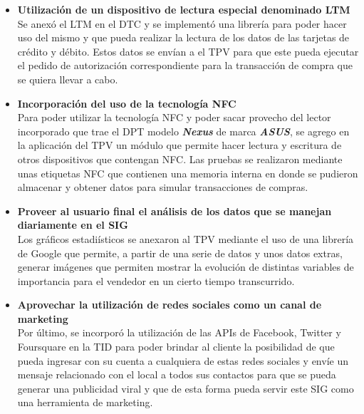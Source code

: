 \begin{itemize}
	\item \textbf{Utilizaci\'on de un dispositivo de lectura especial denominado \ac{LTM}}\\
	  Se anex\'o el \ac{LTM} en el \ac{DTC} y se implement\'o una librer\'ia para poder hacer uso del mismo y que pueda realizar la lectura de los datos de las tarjetas de cr\'edito y d\'ebito. Estos datos se env\'ian a el \ac{TPV} para que este pueda ejecutar el pedido de autorizaci\'on correspondiente para la transacci\'on de compra que se quiera llevar a cabo.

	\item \textbf{Incorporaci\'on del uso de la tecnolog\'ia \ac{NFC}}\\
		Para poder utilizar la tecnolog\'ia \ac{NFC} y poder sacar provecho del lector incorporado que trae el \ac{DPT} modelo \textbf{\textit{Nexus}} de marca \textbf{\textit{ASUS}}, se agrego en la aplicaci\'on del \ac{TPV} un m\'odulo que permite hacer lectura y escritura de otros dispositivos que contengan \ac{NFC}. Las pruebas se realizaron mediante unas etiquetas \ac{NFC} que contienen una memoria interna en donde se pudieron almacenar y obtener datos para simular transacciones de compras.
	
	\item \textbf{Proveer al usuario final el an\'alisis de los datos que se manejan diariamente en el \ac{SIG}}\\
		Los gr\'aficos estadi\'isticos se anexaron al \ac{TPV} mediante el uso de una librer\'ia de Google\Si{\texttrademark} que permite, a partir de una serie de datos y unos datos extras, generar im\'agenes que permiten mostrar la evoluci\'on de distintas variables de importancia para el vendedor en un cierto tiempo transcurrido.
	
	\item \textbf{Aprovechar la utilizaci\'on de redes sociales como un canal de marketing}\\
    Por \'ultimo, se incorpor\'o la utilizaci\'on de las \ac{APIs} de Facebook\Si{\texttrademark}, Twitter\Si{\texttrademark} y Foursquare\Si{\texttrademark} en la \ac{TID} para poder brindar al cliente la posibilidad de que pueda ingresar con su cuenta a cualquiera de estas redes sociales y env\'ie un mensaje relacionado con el local a todos sus contactos para que se pueda generar una publicidad viral y que de esta forma pueda servir este \ac{SIG} como una herramienta de marketing.
    	
\end{itemize}